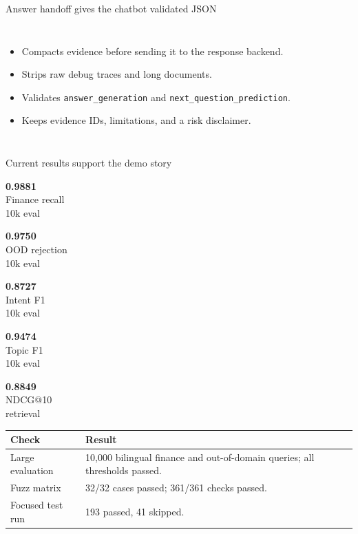 \documentclass[10pt]{beamer}
\newcommand{\metric}[3]{%
  \begin{minipage}{0.18\textwidth}
    \centering
    {\Large\bfseries\textcolor{myNewColorC}{#1}}\\[-0.15em]
    {\scriptsize #2}\\[-0.1em]
    {\tiny\textcolor{mutedInk}{#3}}
  \end{minipage}
}
\begin{document}
\begin{frame}{Answer handoff gives the chatbot validated JSON}
  \begin{columns}[T,onlytextwidth]
      \begin{itemize}
        \item Compacts evidence before sending it to the response backend.
        \item Strips raw debug traces and long documents.
        \item Validates \texttt{answer\_generation} and \texttt{next\_question\_prediction}.
        \item Keeps evidence IDs, limitations, and a risk disclaimer.
      \end{itemize}
  \end{columns}
\end{frame}

\begin{frame}{Current results support the demo story}
  \centering
  \metric{0.9881}{Finance recall}{10k eval}
  \metric{0.9750}{OOD rejection}{10k eval}
  \metric{0.8727}{Intent F1}{10k eval}
  \metric{0.9474}{Topic F1}{10k eval}
  \metric{0.8849}{NDCG@10}{retrieval}

  \vspace{0.7em}
  \begin{tabularx}{0.90\textwidth}{lX}
    \toprule
    Check & Result \\
    \midrule
    Large evaluation & 10,000 bilingual finance and out-of-domain queries; all thresholds passed. \\
    Fuzz matrix & 32/32 cases passed; 361/361 checks passed. \\
    Focused test run & 193 passed, 41 skipped. \\
    \bottomrule
  \end{tabularx}
\end{frame}
\end{document}
